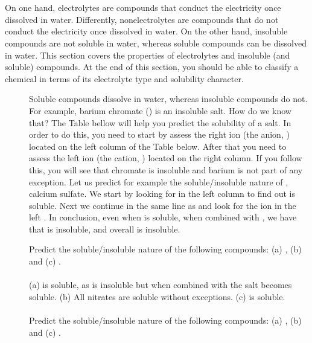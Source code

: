 \documentclass[main.tex]{subfiles} %
\begin{document}
\section{\color{blue!30!black}{Electrolytes and insoluble compounds}}
On one hand, electrolytes are compounds that conduct the electricity once dissolved in water. Differently, nonelectrolytes are compounds that do not conduct the electricity once dissolved in water. On the other hand, insoluble compounds are not soluble in water, whereas soluble compounds can be dissolved in water. This section covers the properties of electrolytes and insoluble (and soluble) compounds. At the end of this section, you should be able to classify a chemical in terms of its electrolyte type and solubility character.
\sloppy 
\begin{description}


\item[] 
Soluble compounds dissolve in water, whereas insoluble compounds do not. For example, barium chromate () is an insoluble salt. How do we know that? The Table bellow will help you predict the solubility of a salt. In order to do this, you need to start by assess the right ion (the anion, ) located on the left column of the Table below. After that you need to assess the left ion (the cation, ) located on the right column. If you follow this, you will see that chromate is insoluble and barium is not part of any exception. Let us predict for example the soluble/insoluble nature of , calcium sulfate. We start by looking for  in the left column to find out is soluble. Next we continue in the same line as  and look for the ion in the left . In conclusion, even when   is soluble, when combined with , we have that  is insoluble, and overall  is insoluble.
\begin{example} %
Predict the soluble/insoluble nature of the following compounds: (a) , (b)  and (c) .
\\
\\
(a)  is soluble, as  is insoluble but when combined with  the salt becomes soluble. (b) All nitrates are soluble without exceptions. (c)  is soluble.
\\
\faDiamond\ \\
Predict the soluble/insoluble nature of the following compounds: (a) , (b)  and (c) .
  \\
\end{example}%



\end{description}
\end{document}

